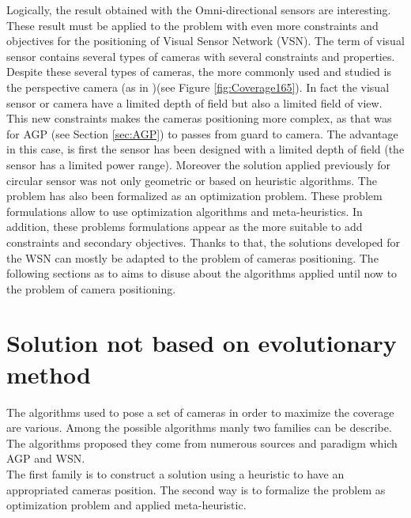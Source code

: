 Logically, the result obtained with the Omni-directional sensors are interesting. These result must be applied to the problem with even more constraints and objectives for the positioning of Visual Sensor Network (VSN). The term of  visual sensor contains several types of cameras with several constraints and properties. Despite these several types of cameras, the more commonly used and studied is the perspective camera (as in \citep{149*mavrinac2013,174*zhang2016,193*fu2014,42*bulusu2001,165*jiang2010})(see Figure \ref{fig:Coverage165}). 
  In fact the visual sensor or camera have a limited depth of field but also a limited field of view. This new constraints makes the cameras positioning more complex, as that was for AGP (see Section \ref{sec:AGP}) to passes from guard to camera.
 The advantage in this case, is first the sensor has been designed with a limited depth of field (the sensor has a limited power range). 
 Moreover the solution applied previously for circular sensor was not only geometric or based on heuristic algorithms. The problem has also been formalized as an optimization problem. These problem formulations allow to use optimization algorithms and meta-heuristics. In addition, these problems formulations appear as the more suitable to add constraints and secondary objectives. Thanks to that, the solutions developed for the WSN can mostly be adapted to the problem of cameras positioning. 
 The following sections as to aims to disuse about the algorithms applied until now to the problem of camera positioning.
  

	\section{Solution not based on evolutionary method}\label{sec:NonEAmethod}
	
The algorithms used to pose a set of cameras in order to maximize the coverage are various.  Among the possible algorithms manly two families can be describe. The algorithms proposed they come from numerous sources and paradigm  which AGP and WSN.\\
 The first family is to construct a solution using a heuristic to have an appropriated cameras position. The second way is to formalize the problem as optimization problem and applied meta-heuristic. 


